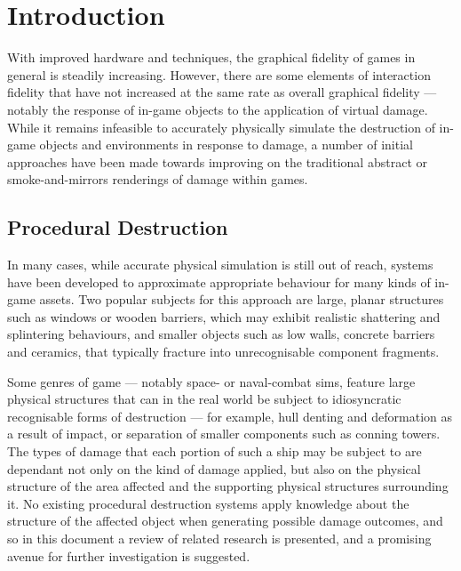 \documentclass[11pt]{report}
\begin{document}
\chapter{Introduction}
	With improved hardware and techniques, the graphical fidelity of games in general is steadily increasing. However, there are some elements of interaction fidelity that have not increased at the same rate as overall graphical fidelity --- notably the response of in-game objects to the application of virtual damage. While it remains infeasible to accurately physically simulate the destruction of in-game objects and environments in response to damage, a number of initial approaches have been made towards improving on the traditional abstract or smoke-and-mirrors renderings of damage within games.

	\section{Procedural Destruction}
		In many cases, while accurate physical simulation is still out of reach, systems have been developed to approximate appropriate behaviour for many kinds of in-game assets. Two popular subjects for this approach are large, planar structures such as windows or wooden barriers, which may exhibit realistic shattering and splintering behaviours, and smaller objects such as low walls, concrete barriers and ceramics, that typically fracture into unrecognisable component fragments.

		Some genres of game --- notably space- or naval-combat sims, feature large physical structures that can in the real world be subject to idiosyncratic recognisable forms of destruction --- for example, hull denting and deformation as a result of impact, or separation of smaller components such as conning towers. The types of damage that each portion of such a ship may be subject to are dependant not only on the kind of damage applied, but also on the physical structure of the area affected and the supporting physical structures surrounding it. No existing procedural destruction systems apply knowledge about the structure of the affected object when generating possible damage outcomes, and so in this document a review of related research is presented, and a promising avenue for further investigation is suggested.
\end{document}
